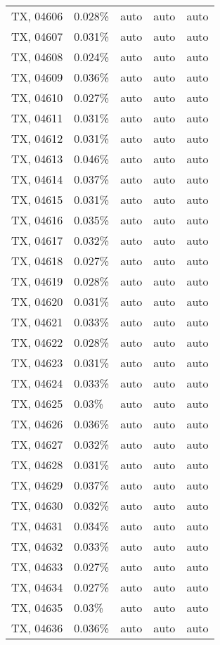 \begin{longtable}[]{@{}lllll@{}}
TX, 04606 & 0.028\% & auto & auto & auto \\
TX, 04607 & 0.031\% & auto & auto & auto \\
TX, 04608 & 0.024\% & auto & auto & auto \\
TX, 04609 & 0.036\% & auto & auto & auto \\
TX, 04610 & 0.027\% & auto & auto & auto \\
TX, 04611 & 0.031\% & auto & auto & auto \\
TX, 04612 & 0.031\% & auto & auto & auto \\
TX, 04613 & 0.046\% & auto & auto & auto \\
TX, 04614 & 0.037\% & auto & auto & auto \\
TX, 04615 & 0.031\% & auto & auto & auto \\
TX, 04616 & 0.035\% & auto & auto & auto \\
TX, 04617 & 0.032\% & auto & auto & auto \\
TX, 04618 & 0.027\% & auto & auto & auto \\
TX, 04619 & 0.028\% & auto & auto & auto \\
TX, 04620 & 0.031\% & auto & auto & auto \\
TX, 04621 & 0.033\% & auto & auto & auto \\
TX, 04622 & 0.028\% & auto & auto & auto \\
TX, 04623 & 0.031\% & auto & auto & auto \\
TX, 04624 & 0.033\% & auto & auto & auto \\
TX, 04625 & 0.03\% & auto & auto & auto \\
TX, 04626 & 0.036\% & auto & auto & auto \\
TX, 04627 & 0.032\% & auto & auto & auto \\
TX, 04628 & 0.031\% & auto & auto & auto \\
TX, 04629 & 0.037\% & auto & auto & auto \\
TX, 04630 & 0.032\% & auto & auto & auto \\
TX, 04631 & 0.034\% & auto & auto & auto \\
TX, 04632 & 0.033\% & auto & auto & auto \\
TX, 04633 & 0.027\% & auto & auto & auto \\
TX, 04634 & 0.027\% & auto & auto & auto \\
TX, 04635 & 0.03\% & auto & auto & auto \\
TX, 04636 & 0.036\% & auto & auto & auto \\

\end{longtable}
